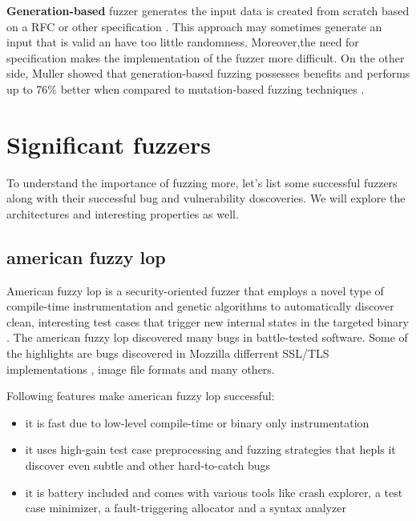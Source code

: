 \textbf{Generation-based} fuzzer generates the input data is created from scratch based on a RFC or other specification \cite{miller2007analysis}. This approach may sometimes generate an input that is valid an have too little randomness. Moreover,the need for specification makes the implementation of the fuzzer more difficult. On the other side, Muller showed that generation-based fuzzing possesses benefits and performs up to 76\% better when compared to mutation-based fuzzing techniques \cite{miller2007analysis}.


\section{Significant fuzzers}
\label{ssub:Significant fuzzers}
To understand the importance of fuzzing more, let's list some successful fuzzers along with their successful bug and vulnerability doscoveries. We will explore the architectures and interesting properties as well.

\subsection{american fuzzy lop}
American fuzzy lop is a security-oriented fuzzer that employs a novel type of compile-time instrumentation and genetic algorithms to automatically discover clean, interesting test cases that trigger new internal states in the targeted binary \cite{zalewski2018american}. The american fuzzy lop discovered many bugs in battle-tested software. Some of the highlights are bugs discovered in Mozzilla \cite{zalewski2014uninitialized, zalewski2014two, zalewski2015uninitialized, mozzilla2015update} differrent SSL/TLS implementations \cite{bock2015out, sharma2014gnutls}, image file formats \cite{zalewski2013ijg, cunningham2014segv} and many others.


Following features make american fuzzy lop successful:
\begin{itemize}
    \item it is fast due to low-level compile-time or binary only instrumentation
    \item it uses high-gain test case preprocessing and fuzzing strategies that hepls it discover even subtle and other hard-to-catch bugs
    \item it is battery included and comes with various tools like crash explorer, a test case minimizer, a fault-triggering allocator and a syntax analyzer
\end{itemize}

